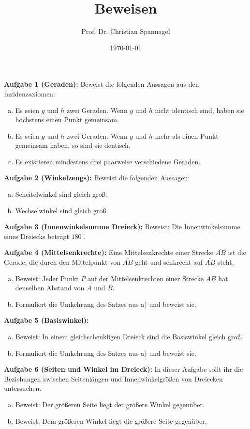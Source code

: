 \documentclass[12pt,a4paper,oneside,ngerman]{article}
\title{Beweisen}
\author{Prof. Dr. Christian Spannagel}
\date{\today}
\begin{document}
\pagestyle{fancy}
\begin{center}
{\LARGE\textbf{\thetitle}}
\end{center}


\textbf{Aufgabe 1 (Geraden):}  Beweist die folgenden Aussagen aus den Inzidenzaxiomen:
\begin{enumerate}[a)]
\item Es seien $g$ und $h$ zwei Geraden. Wenn $g$ und $h$ nicht identisch sind, haben sie höchstens einen Punkt gemeinsam.
\item Es seien $g$ und $h$ zwei Geraden. Wenn $g$ und $h$ mehr als einen Punkt gemeinsam haben, so sind sie dentisch.
\item Es existieren mindestens drei paarweise verschiedene Geraden.
\end{enumerate}

\textbf{Aufgabe 2 (Winkelzeugs):}  Beweist die folgenden Aussagen:
\begin{enumerate}[a)]
\item Scheitelwinkel sind gleich groß.
\item Wechselwinkel sind gleich groß.
\end{enumerate}


\textbf{Aufgabe 3 (Innenwinkelsumme Dreieck):}  Beweist: Die Innenwinkelsumme eines Dreiecks beträgt $180^\circ$.

\textbf{Aufgabe 4 (Mittelsenkrechte):} Eine Mittelsenkrechte einer Strecke $\overline{AB}$ ist die Gerade, die durch den Mittelpunkt von $\overline{AB}$ geht und senkrecht auf $\overline{AB}$ steht.
\begin{enumerate}[a)]
\item Beweist: Jeder Punkt $P$ auf der Mittelsenkrechten einer Strecke $\overline{AB}$ hat denselben Abstand von $A$ und $B$.
\item Formuliert die Umkehrung des Satzes aus a) und beweist sie.
\end{enumerate}

\textbf{Aufgabe 5 (Basiswinkel):} 
\begin{enumerate}[a)]
\item Beweist: In einem gleichschenkligen Dreieck sind die Basiswinkel gleich groß.
\item Formuliert die Umkehrung des Satzes aus a) und beweist sie.
\end{enumerate}

\textbf{Aufgabe 6 (Seiten und Winkel im Dreieck):} 
In dieser Aufgabe sollt ihr die Beziehungen zwischen Seitenlängen und Innenwinkelgrößen von Dreiecken untersuchen.
\begin{enumerate}[a)]
\item Beweist: Der größeren Seite liegt der größere Winkel gegenüber.
\item Beweist: Dem größeren Winkel liegt die größere Seite gegenüber.
\end{enumerate}
\end{document}
